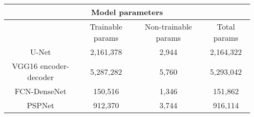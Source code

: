 \begin{table}[]
	\centering
	\caption{}
	\label{tab:table_parameters}
	\resizebox{\textwidth}{!}
	{
		\begin{tabular}{cccc}
			\multicolumn{4}{c}{Model parameters} \\ \hline
			& Trainable params & Non-trainable params & Total params \\ \hline
			U-Net & 2,161,378 & 2,944 & 2,164,322 \\ \hline
			VGG16 encoder-decoder & 5,287,282 & 5,760 & 5,293,042 \\ \hline
			FCN-DenseNet & 150,516 & 1,346 & 151,862 \\ \hline
			PSPNet & 912,370 & 3,744 & 916,114 \\ \hline
		\end{tabular}
	}
\end{table}

\label{section:results_and_discussions}
